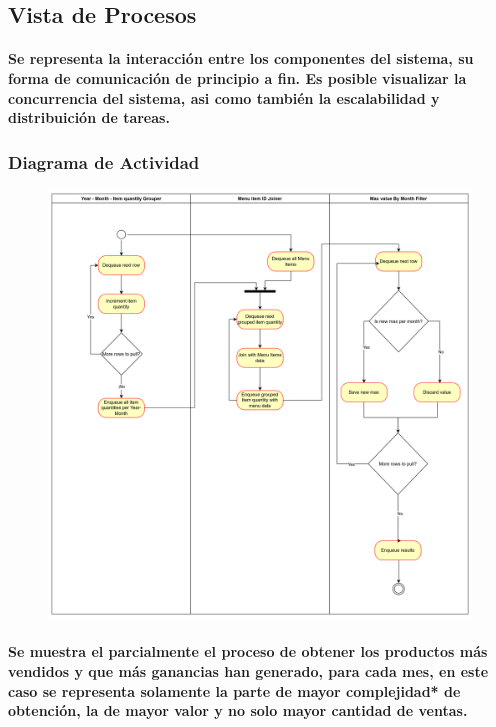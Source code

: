 \documentclass[titlepage,a4paper]{article}
\begin{document}
\subsection{Vista de Procesos}

\paragraph{Se representa la interacción entre los componentes del sistema, su forma de comunicación de principio a fin. Es posible visualizar la concurrencia del sistema, asi como también la escalabilidad y distribuición de tareas.}

\subsubsection{Diagrama de Actividad}
\begin{figure}[H]
    \centering
    \includegraphics[width=1\linewidth]{actividad.png}
\end{figure}
\paragraph{Se muestra el parcialmente el proceso de obtener los productos más vendidos y que más ganancias han generado, para cada mes, en este caso se representa solamente la parte de mayor complejidad* de obtención, la de mayor valor y no solo mayor cantidad de ventas.}
\end{document}
